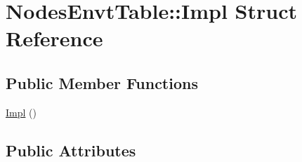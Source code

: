 \hypertarget{struct_nodes_envt_table_1_1_impl}{}\section{Nodes\+Envt\+Table\+::Impl Struct Reference}
\label{struct_nodes_envt_table_1_1_impl}
\subsection*{Public Member Functions}
\begin{DoxyCompactItemize}
\item 
\mbox{\hyperlink{struct_nodes_envt_table_1_1_impl_a7865c7ad48dc8a79d9831bc5f6b360ad}{Impl}} ()
\end{DoxyCompactItemize}
\subsection*{Public Attributes}
